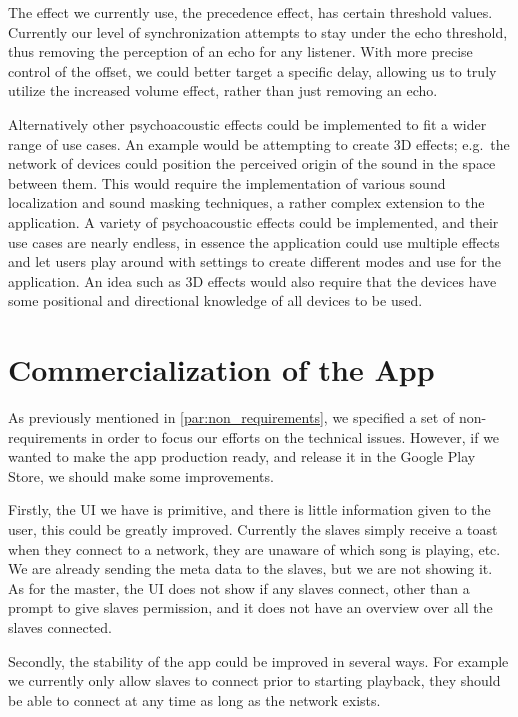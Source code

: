 \bigskip
The effect we currently use, the precedence effect, has certain threshold values.
Currently our level of synchronization attempts to stay under the echo threshold, thus removing the perception of an echo for any listener.
With more precise control of the offset, we could better target a specific delay, allowing us to truly utilize the increased volume effect, rather than just removing an echo.

Alternatively other psychoacoustic effects could be implemented to fit a wider range of use cases.
An example would be attempting to create 3D effects; e.g.~the network of devices could position the perceived origin of the sound in the space between them.
This would require the implementation of various sound localization and sound masking techniques, a rather complex extension to the application.
A variety of psychoacoustic effects could be implemented, and their use cases are nearly endless, in essence the application could use multiple effects and let users play around with settings to create different modes and use for the application.
An idea such as 3D effects would also require that the devices have some positional and directional knowledge of all devices to be used.

\section{Commercialization of the App}
As previously mentioned in \cref{par:non_requirements}, we specified a set of non-requirements in order to focus our efforts on the technical issues.
However, if we wanted to make the app production ready, and release it in the Google Play Store, we should make some improvements.

Firstly, the UI we have is primitive, and there is little information given to the user, this could be greatly improved.
Currently the slaves simply receive a toast when they connect to a network, they are unaware of which song is playing, etc.
We are already sending the meta data to the slaves, but we are not showing it.
As for the master, the UI does not show if any slaves connect, other than a prompt to give slaves permission, and it does not have an overview over all the slaves connected.

Secondly, the stability of the app could be improved in several ways.
For example we currently only allow slaves to connect prior to starting playback, they should be able to connect at any time as long as the network exists.

